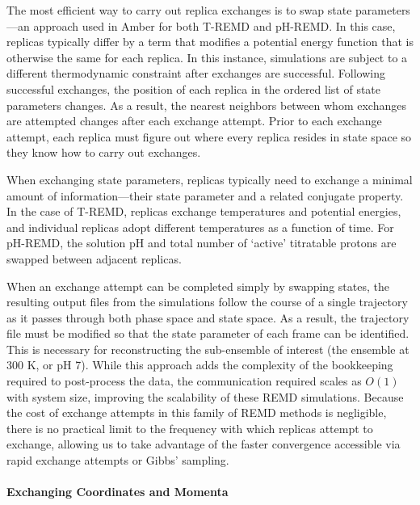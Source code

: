 The most efficient way to carry out replica exchanges is to swap state
parameters---an approach used in Amber for both T-REMD and pH-REMD. In this
case, replicas typically differ by a term that modifies a potential energy
function that is otherwise the same for each replica. In this instance,
simulations are subject to a different thermodynamic constraint after exchanges
are successful. Following successful exchanges, the position of each replica in
the ordered list of state parameters changes. As a result, the nearest neighbors
between whom exchanges are attempted changes after each exchange attempt.
Prior to each exchange attempt, each replica must figure out where every replica
resides in state space so they know how to carry out exchanges.

When exchanging state parameters, replicas typically need to exchange a minimal
amount of information---their state parameter and a related conjugate property.
In the case of T-REMD, replicas exchange temperatures and potential energies,
and individual replicas adopt different temperatures as a function of time. For
pH-REMD, the solution pH and total number of `active' titratable protons are
swapped between adjacent replicas.

When an exchange attempt can be completed simply by swapping states, the
resulting output files from the simulations follow the course of a single
trajectory as it passes through both phase space and state space. As a result,
the trajectory file must be modified so that the state parameter of each frame
can be identified. This is necessary for reconstructing the sub-ensemble of
interest (\eg the ensemble at 300 K, or pH 7). While this approach adds the
complexity of the bookkeeping required to post-process the data, the
communication required scales as $O(1)$ with system size, improving the
scalability of these REMD simulations.
\cite{Swails_JChemTheoryComput_2012_v8_p4393} Because the cost of exchange
attempts in this family of REMD methods is negligible, there is no practical
limit to the frequency with which replicas attempt to exchange, allowing us to
take advantage of the faster convergence accessible via rapid exchange attempts
\cite{Sindhikara2008, Sindhikara2010} or Gibbs' sampling.
\cite{Chodera_JChemPhys_2011_v135_p194110}

\paragraph{Exchanging Coordinates and Momenta}

